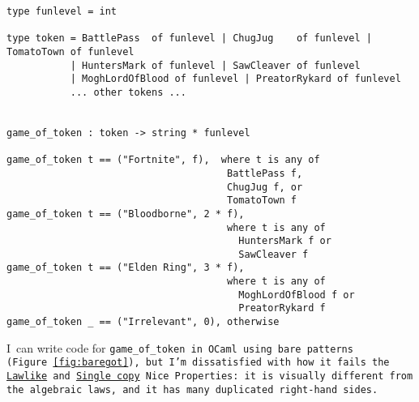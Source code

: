 \documentclass[manuscript,screen,review, 12pt, nonacm]{acmart}
\begin{document}
\begin{minipage}[t]{\textwidth}
    \centering 
    \begin{footnotesize}
      \begin{verbatim}  
type funlevel = int

type token = BattlePass  of funlevel | ChugJug    of funlevel | TomatoTown of funlevel
           | HuntersMark of funlevel | SawCleaver of funlevel
           | MoghLordOfBlood of funlevel | PreatorRykard of funlevel
           ... other tokens ...
                    

game_of_token : token -> string * funlevel

game_of_token t == ("Fortnite", f),  where t is any of 
                                      BattlePass f, 
                                      ChugJug f, or
                                      TomatoTown f
game_of_token t == ("Bloodborne", 2 * f), 
                                      where t is any of 
                                        HuntersMark f or 
                                        SawCleaver f
game_of_token t == ("Elden Ring", 3 * f), 
                                      where t is any of 
                                        MoghLordOfBlood f or  
                                        PreatorRykard f
game_of_token _ == ("Irrelevant", 0), otherwise
      \end{verbatim}
    \end{footnotesize}
  \end{minipage}  
        
        I~can write code for \tt{game\_of\_token} in OCaml using bare patterns
        (Figure~\ref{fig:baregot}), but I'm dissatisfied with how it fails the
        \hyperref[p1]{Lawlike} and~\hyperref[p2]{Single copy} Nice~Properties:
        it is visually different from the algebraic laws, and it has many
        duplicated right-hand sides.
        
\end{document}
